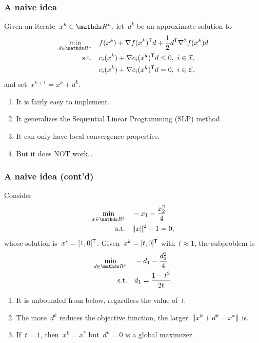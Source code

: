 \documentclass{polyu-presentation}
\newcommand{\con}[1]{c_{#1}}
\newcommand{\ieq}{\mathcal{E}}
\newcommand{\iub}{\mathcal{I}}
\newcommand{\obj}{f}
\begin{document}
\begin{frame}
    \frametitle{A naive idea}

    Given an iterate~$x^k \in \R^n$, let~$d^k$ be an approximate solution to
    \begin{align*}
        \min_{d \in \R^n}   & \quad \obj(x^k) + \nabla \obj(x^k)^{\T} d + \frac{1}{2} d^{\T} \nabla^2 \obj(x^k) d\\
        \text{s.t.}         & \quad \con{i}(x^k) + \nabla \con{i}(x^k)^{\T} d \le 0, ~ i \in \iub,\\
                            & \quad \con{i}(x^k) + \nabla \con{i}(x^k)^{\T} d = 0, ~ i \in \ieq,
    \end{align*}
    and set~$x^{k + 1} = x^k + d^k$.
    
    \medskip

    \begin{block}{}
        \begin{enumerate}[<+(1)->]
            \item It is fairly easy to \alert{implement}.
            \item It generalizes the \alert{Sequential Linear Programming} (SLP) method.
            \item It can only have \alert{local convergence} properties.
            \item But it does \alert{NOT} work\dots
        \end{enumerate}
    \end{block}
\end{frame}

\begin{frame}
    \frametitle{A naive idea (cont'd)}

    Consider
    \begin{align*}
        \min_{x \in \R^2}   & \quad -x_1 - \frac{x_2^2}{4}\\
        \text{s.t.}         & \quad \norm{x}^2 - 1 = 0,
    \end{align*}
    whose \alert{solution} is~$x^{\ast} = [1, 0]^{\mathsf{T}}$.
    Given~$x^k = [t, 0]^{\mathsf{T}}$ with~$t \approx 1$, the subproblem is
    \begin{align*}
        \min_{d \in \R^n}   & \quad -d_1 - \frac{d_2^2}{4}\\
        \text{s.t.}         & \quad d_1 = \frac{1 - t^2}{2t}.
    \end{align*}

    \begin{block}{}
        \begin{enumerate}[<+(1)->]
            \item It is \alert{unbounded from below}, regardless the value of~$t$.
            \item The more~$d^k$ \alert{reduces} the objective function, the \alert{larger}~$\lVert x^k + d^k - x^{\ast}\rVert$ is.
            \item If~$t = 1$, then~$x^k = x^{\ast}$ but~$d^k = 0$ is a \alert{global maximizer}.
        \end{enumerate}
    \end{block}
\end{frame}
\end{document}
